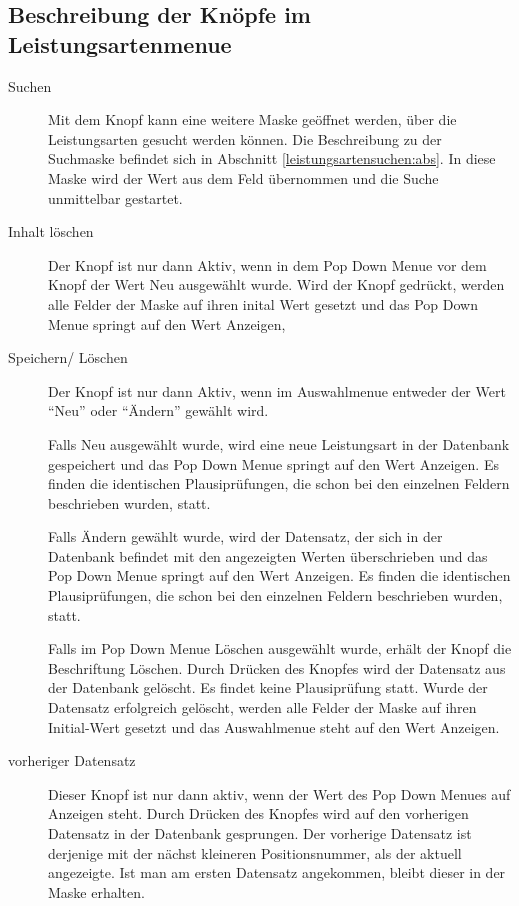 \subsection{Beschreibung der Knöpfe im Leistungsartenmenue}
\begin{description}
\item[Suchen] Mit dem Knopf  kann eine weitere Maske geöffnet
werden, über die Leistungsarten gesucht werden können. Die Beschreibung zu der
Suchmaske befindet sich in Abschnitt \vref{leistungsartensuchen:abs}.
In diese Maske wird der Wert aus dem Feld  übernommen 
und die Suche unmittelbar gestartet.
\item[Inhalt löschen] Der Knopf  ist nur dann
Aktiv, wenn in dem
Pop Down Menue vor dem Knopf der Wert Neu ausgewählt wurde. Wird der Knopf
gedrückt, werden alle Felder der Maske auf ihren inital Wert gesetzt und das
Pop Down Menue springt auf den Wert Anzeigen,
\item[Speichern/ Löschen] Der Knopf  ist nur dann Aktiv,
wenn im Auswahlmenue entweder der Wert ``Neu'' oder ``Ändern'' gewählt wird. 
\par
Falls Neu 
ausgewählt wurde, wird eine neue Leistungsart in der Datenbank gespeichert
und das Pop Down Menue springt auf den Wert Anzeigen. Es finden die
identischen Plausiprüfungen, die schon bei den einzelnen Feldern
beschrieben wurden, statt.
\par
Falls Ändern gewählt wurde, wird der Datensatz, der sich in der Datenbank
befindet mit den angezeigten Werten überschrieben und das Pop Down Menue
springt auf den Wert Anzeigen. 
Es finden die
identischen Plausiprüfungen, die schon bei den einzelnen Feldern
beschrieben wurden,
statt.\par
Falls im Pop Down Menue Löschen ausgewählt wurde, erhält der Knopf die
Beschriftung Löschen. Durch Drücken des Knopfes wird der Datensatz aus der
Datenbank gelöscht. Es findet keine Plausiprüfung statt.
Wurde der Datensatz erfolgreich gelöscht, werden
alle Felder der Maske auf ihren Initial-Wert gesetzt und das Auswahlmenue
steht auf den Wert Anzeigen.
\item[vorheriger Datensatz] Dieser Knopf ist nur dann aktiv, wenn der Wert
des Pop Down Menues auf Anzeigen steht. Durch Drücken des Knopfes wird auf
den vorherigen Datensatz in der Datenbank gesprungen. Der vorherige Datensatz
ist derjenige mit der nächst kleineren Positionsnummer, 
als der aktuell angezeigte. Ist
man am ersten Datensatz angekommen, bleibt dieser in der Maske erhalten.

\end{description}
